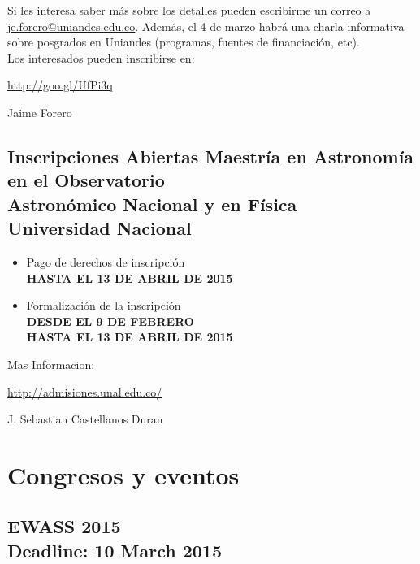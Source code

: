 \documentclass{book}
\begin{document}
Si les interesa saber más sobre los detalles pueden escribirme un correo a \url{je.forero@uniandes.edu.co}. Además, el 4 de marzo habrá una charla informativa sobre posgrados en Uniandes (programas, fuentes de financiación, etc).\\

Los interesados pueden inscribirse en:\\

\begin{center}
\url{http://goo.gl/UfPi3q}
\end{center}

\begin{flushright}
Jaime Forero
\end{flushright}


\subsection{Inscripciones Abiertas Maestría en Astronomía en el Observatorio\\ Astronómico Nacional y en Física\\ Universidad Nacional}

\begin{itemize}
\item Pago de derechos de inscripción \\
\textbf{HASTA EL 13 DE ABRIL DE 2015}
\item Formalización de la inscripción\\
\textbf{DESDE EL 9 DE FEBRERO}\\
\textbf{HASTA EL 13 DE ABRIL DE 2015}
\end{itemize}

Mas Informacion:
\begin{center}
\url{http://admisiones.unal.edu.co/}
\end{center}


\begin{flushright}
J. Sebastian Castellanos Duran
\end{flushright}



\section*{Congresos y eventos}

\subsection{EWASS 2015\\ Deadline: 10 March 2015}
\end{document}
